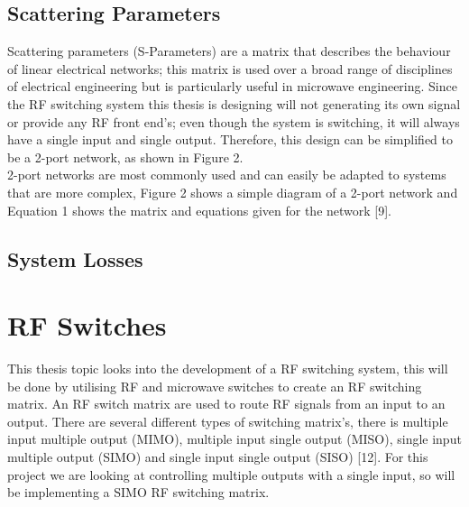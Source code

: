 \documentclass[12pt,openany,a4paper]{book}
\begin{document}
\subsection{Scattering Parameters}
Scattering parameters (S-Parameters) are a matrix that describes the behaviour of linear electrical networks; this matrix is used over a broad range of disciplines of electrical engineering but is particularly useful in microwave engineering.
Since the RF switching system this thesis is designing will not generating its own signal or provide any RF front end's; even though the system is switching, it will always have a single input and single output. Therefore, this design can be simplified to be a 2-port network, as shown in Figure 2.\\[0.1cm]
2-port networks are most commonly used and can easily be adapted to systems that are more complex, Figure 2 shows a simple diagram of a 2-port network and Equation 1 shows the matrix and equations given for the network [9].

\subsection{System Losses}










\section{RF Switches}
This thesis topic looks into the development of a RF switching system, this will be done by utilising RF and microwave switches to create an RF switching matrix. An RF switch matrix are used to route RF signals from an input to an output.
There are several different types of switching matrix's, there is multiple input multiple output (MIMO), multiple input single output (MISO), single input multiple output (SIMO) and single input single output (SISO) [12]. For this project we are looking at controlling multiple outputs with a single input, so will be implementing a SIMO RF switching matrix.
\end{document}
